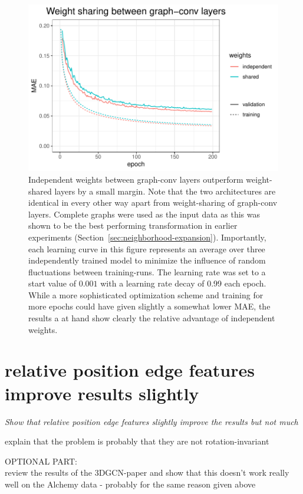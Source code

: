 \begin{figure}[H]
	\includegraphics[width=\linewidth]{figures/weight-sharing.pdf}
	
	\caption{Independent weights between graph-conv layers outperform weight-shared layers by a small margin. Note that the two architectures are identical in every other way apart from weight-sharing of graph-conv layers. Complete graphs were used as the input data as this was shown to be the best performing transformation in earlier experiments (Section~\ref{sec:neighborhood-expansion}). Importantly, each learning curve in this figure represents an average over three independently trained model to minimize the influence of random fluctuations between training-runs. The learning rate was set to a start value of $0.001$ with a learning rate decay of 0.99 each epoch. While a more sophisticated optimization scheme and training for more epochs could have given slightly a somewhat lower MAE, the results a at hand show clearly the relative advantage of independent weights.}
	\label{fig:weight-sharing}
\end{figure}

\section{relative position edge features improve results slightly}

{\itshape
 Show that relative position edge features slightly improve the results but not much
 
 explain that the problem is probably that they are not rotation-invariant
	
	
OPTIONAL PART:\\
review the results of the 3DGCN-paper and show that this doesn't work really well on the Alchemy data - probably for the same reason given above
}






